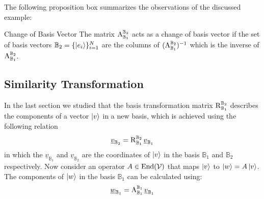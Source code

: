 The following proposition box summarizes the observations of the discussed example:

\begin{propbox}{Change of Basis Vector}
	The matrix $ \operatorname{A}_{\mathbb{B}_1}^{\mathbb{B}_2} $ acts as a change of basis vector if the set of basis vectors $ \mathbb{B}_{2} = \{ \ket{{e}_{i}} \}_{i=1}^{N} $ are the columns of $ (\operatorname{A}_{\mathbb{B}_1}^{\mathbb{B}_2})^{-1} $ which is the inverse of $ \operatorname{A}_{\mathbb{B}_1}^{\mathbb{B}_2} $.
\end{propbox}

\subsection{Similarity Transformation}

In the last section we studied that the basis transformation matrix $ \operatorname{R}_{\mathbb{B}_1}^{\mathbb{B}_2} $ describes the components of a vector $ \ket{v} $ in a new basis, which is achieved using the following relation
\begin{equation*}
	\underline{v}_{\mathbb{B}_2} = \operatorname{R}_{\mathbb{B}_1}^{\mathbb{B}_2} \underline{v}_{\mathbb{B}_1}
\end{equation*}
in which the $ 	\underline{v}_{\mathbb{B}_1} $ and $ \underline{v}_{\mathbb{B}_2} $ are the coordinates of $ \ket{v} $ in the basis $ \mathbb{B}_1 $ and $ \mathbb{B}_2 $ respectively. Now consider an operator $ A \in \operatorname{End}(\mathcal{V}) $ that maps $ \ket{v} $ to $ \ket{w} = A\ket{v} $. The components of $ \ket{w} $ in the basis $ \mathbb{B}_1 $ can be calculated using: 
\[  \underline{w}_{\mathbb{B}_1} = \operatorname{A}_{\mathbb{B}_1}^{\mathbb{B}_1} \underline{v}_{\mathbb{B}_1} \]

